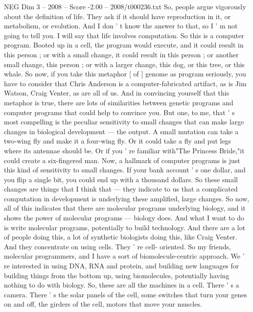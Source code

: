 \begin{textsample}{NEG Dim 3 – 2008 – Score -2.00 – 2008/t000236.txt}  \label{ex:f3_neg_019}
So, people argue vigorously about the definition of life.
They ask if it should have reproduction in it, or metabolism, or evolution.
And I don ' t know the answer to that, so I ' m not going to tell you.
I will say that life involves computation.
So this is a computer program.
Booted up in a cell, the program would execute, and it could result in this person ; or with a small change, it could result in this person ; or another small change, this person ; or with a larger change, this dog, or this tree, or this whale.
So now, if you take this metaphor [ of ] genome as program seriously, you have to consider that Chris Anderson is a computer-fabricated artifact, as is Jim Watson, Craig Venter, as are all of us.
And in convincing yourself that this metaphor is true, there are lots of similarities between genetic programs and computer programs that could help to convince you.
But one, to me, that ' s most compelling is the peculiar sensitivity to small changes that can make large changes in biological development — the output.
A small mutation can take a two-wing fly and make it a four-wing fly.
Or it could take a fly and put legs where its antennae should be.
Or if you ' re familiar with"The Princess Bride,"it could create a six-fingered man.
Now, a hallmark of computer programs is just this kind of sensitivity to small changes.
If your bank account ' s one dollar, and you flip a single bit, you could end up with a thousand dollars.
So these small changes are things that I think that — they indicate to us that a complicated computation in development is underlying these amplified, large changes.
So now, all of this indicates that there are molecular programs underlying biology, and it shows the power of molecular programs — biology does.
And what I want to do is write molecular programs, potentially to build technology.
And there are a lot of people doing this, a lot of synthetic biologists doing this, like Craig Venter.
And they concentrate on using cells.
They ' re cell- oriented.
So my friends, molecular programmers, and I have a sort of biomolecule-centric approach.
We ' re interested in using DNA, RNA and protein, and building new languages for building things from the bottom up, using biomolecules, potentially having nothing to do with biology.
So, these are all the machines in a cell.
There ' s a camera.
There ' s the solar panels of the cell, some switches that turn your genes on and off, the girders of the cell, motors that move your muscles.

\end{textsample}
